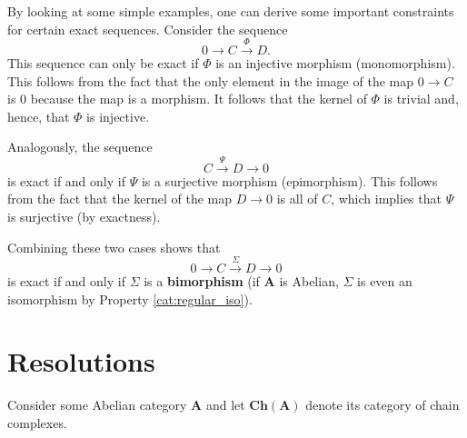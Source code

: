 	\begin{property}
		By looking at some simple examples, one can derive some important constraints for certain exact sequences. Consider the sequence \[0\longrightarrow C\overset{\Phi}{\longrightarrow}D.\] This sequence can only be exact if $\Phi$ is an injective morphism (monomorphism). This follows from the fact that the only element in the image of the map $0\rightarrow C$ is 0 because the map is a morphism. It follows that the kernel of $\Phi$ is trivial and, hence, that $\Phi$ is injective.

		Analogously, the sequence \[C\overset{\Psi}{\longrightarrow}D\longrightarrow0\] is exact if and only if $\Psi$ is a surjective morphism (epimorphism). This follows from the fact that the kernel of the map $D\rightarrow0$ is all of $C$, which implies that $\Psi$ is surjective (by exactness).

		Combining these two cases shows that \[0\longrightarrow C\overset{\Sigma}{\longrightarrow}D\longrightarrow0\] is exact if and only if $\Sigma$ is a \textbf{bimorphism} (if $\mathbf{A}$ is Abelian, $\Sigma$ is even an isomorphism by Property \ref{cat:regular_iso}).
	\end{property}

\section{Resolutions}

	Consider some Abelian category $\mathbf{A}$ and let $\mathbf{Ch(A)}$ denote its category of chain complexes.



